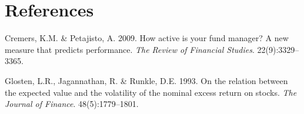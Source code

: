 \documentclass[11pt,preprint]{elsarticle}
\numberwithin{equation}{section}
\numberwithin{figure}{section}
\numberwithin{table}{section}
\newlength{\cslhangindent}
\newenvironment{CSLReferences}[2] %
{\begin{list}{}{%
	\setlength{\itemindent}{0pt}
	\setlength{\leftmargin}{0pt}
	\setlength{\parsep}{0pt}
	\ifodd #1
	\setlength{\leftmargin}{\cslhangindent}
	\setlength{\itemindent}{-1\cslhangindent}
	\fi
	\setlength{\itemsep}{#2\baselineskip}}}
{\end{list}}
\begin{document}
\newpage

\section*{References}\label{references}

\protect{}\label{refs}
\begin{CSLReferences}{1}{1}
Cremers, K.M. \& Petajisto, A. 2009. How active is your fund manager? A
new measure that predicts performance. \emph{The Review of Financial
Studies}. 22(9):3329--3365.

Glosten, L.R., Jagannathan, R. \& Runkle, D.E. 1993. On the relation
between the expected value and the volatility of the nominal excess
return on stocks. \emph{The Journal of Finance}. 48(5):1779--1801.

\end{CSLReferences}


\end{document}
